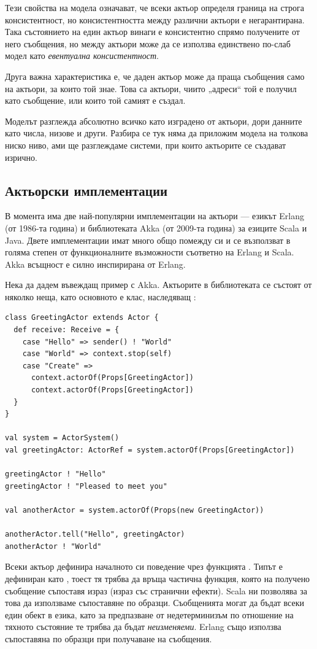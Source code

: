 Тези свойства на модела означават, че всеки актьор определя граница на строга консистентност, но консистентността между различни актьори е негарантирана. Така състоянието на един актьор винаги е консистентно спрямо получените от него съобщения, но между актьори може да се използва единствено по-слаб модел като \emph{евентуална консистентност}.

Друга важна характеристика е, че даден актьор може да праща съобщения само на актьори, за които той знае. Това са актьори, чиито „адреси“ той е получил като съобщение, или които той самият е създал.

Моделът разглежда абсолютно всичко като изградено от актьори, дори данните като числа, низове и други. Разбира се тук няма да приложим модела на толкова ниско ниво, ами ще разглеждаме системи, при които актьорите се създават изрично.

\subsection{Актьорски имплементации}

В момента има две най-популярни имплементации на актьори — езикът Erlang (от 1986-та година) и библиотеката Akka (от 2009-та година) за езиците Scala и Java. Двете имплементации имат много общо помежду си и се възползват в голяма степен от функционалните възможности съответно на Erlang и Scala. Akka всъщност е силно инспирирана от Erlang.

Нека да дадем въвеждащ пример с Akka. Актьорите в библиотеката се състоят от няколко неща, като основното е клас, наследяващ :

\begin{lstlisting}[style=listing]
class GreetingActor extends Actor {
  def receive: Receive = {
    case "Hello" => sender() ! "World"
    case "World" => context.stop(self)
    case "Create" =>
      context.actorOf(Props[GreetingActor])
      context.actorOf(Props[GreetingActor])
  }
}

val system = ActorSystem()
val greetingActor: ActorRef = system.actorOf(Props[GreetingActor])

greetingActor ! "Hello"
greetingActor ! "Pleased to meet you"

val anotherActor = system.actorOf(Props(new GreetingActor))

anotherActor.tell("Hello", greetingActor)
anotherActor ! "World"
\end{lstlisting}

Всеки актьор дефинира началното си поведение чрез функцията . Типът  е дефиниран като , тоест тя трябва да връща частична функция, която на получено съобщение съпоставя  израз (израз със странични ефекти). Scala ни позволява за това да използваме съпоставяне по образци. Съобщенията могат да бъдат всеки един обект в езика, като за предпазване от недетерминизъм по отношение на тяхното състояние те трябва да бъдат \emph{неизменяеми}. Erlang също използва съпоставяна по образци при получаване на съобщения.

